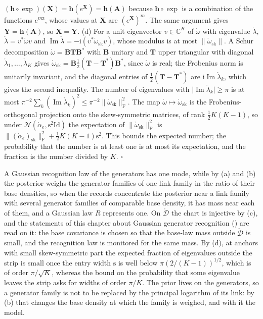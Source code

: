 $(\mathbf h\circ\exp)(\mathbf X)=\mathbf h(e^{\mathbf X})=\mathbf h(\mathbf A)$ because $\mathbf h\circ\exp$ is a
combination of the functions $e^{m\mathrm z}$, whose values at $\mathbf X$ are $(e^{\mathbf X})^m$. The same
argument gives $\mathbf Y=\mathbf h(\mathbf A)$, so $\mathbf X=\mathbf Y$.
(d) For a unit eigenvector $v\in\mathbb C^K$ of $\mathring\omega$ with eigenvalue $\mathring\lambda$,
$\mathring\lambda=v^*\mathring\omega v$ and $\operatorname{Im}\mathring\lambda=-\mathrm i(v^*\mathring\omega_{\mathrm{sk}}v)$,
whose modulus is at most $\lVert\mathring\omega_{\mathrm{sk}}\rVert$. A Schur decomposition
$\mathring\omega=\mathbf B\mathbf T\mathbf B^*$ with $\mathbf B$ unitary and $\mathbf T$ upper triangular with diagonal
$\mathring\lambda_1,\ldots,\mathring\lambda_K$ gives
$\mathring\omega_{\mathrm{sk}}=\mathbf B\tfrac12(\mathbf T-\mathbf T^*)\mathbf B^*$, since $\mathring\omega$ is real;
the Frobenius norm is unitarily invariant, and the diagonal entries of $\tfrac12(\mathbf T-\mathbf T^*)$ are
$\mathrm i\operatorname{Im}\mathring\lambda_k$, which gives the second inequality. The number of eigenvalues
with $\lvert\operatorname{Im}\mathring\lambda_k\rvert\geq\pi$ is at most
$\pi^{-2}\sum_k(\operatorname{Im}\mathring\lambda_k)^2\leq\pi^{-2}\lVert\mathring\omega_{\mathrm{sk}}\rVert^2_{\mathrm F}$.
The map $\mathring\omega\mapsto\mathring\omega_{\mathrm{sk}}$ is the Frobenius-orthogonal projection onto the
skew-symmetric matrices, of rank $\tfrac12K(K-1)$, so under $\mathcal N(\mathring\alpha_e,\mathrm s^2\mathrm{Id})$
the expectation of $\lVert\mathring\omega_{\mathrm{sk}}\rVert^2_{\mathrm F}$ is
$\lVert(\mathring\alpha_e)_{\mathrm{sk}}\rVert^2_{\mathrm F}+\tfrac12K(K-1)\mathrm s^2$. This bounds the expected
number; the probability that the number is at least one is at most its expectation, and the fraction is
the number divided by $K$. \hfill$\square$

A Gaussian recognition law of the generators has one mode, while by (a) and (b) the posterior weighs the
generator families of one link family in the ratio of their base densities, so when the records
concentrate the posterior near a link family with several generator families of comparable base density,
it has mass near each of them, and a Gaussian law $R$ represents one. On $\mathring{\mathcal D}$ the chart
is injective by (c), and the statements of this chapter about Gaussian generator recognition
() are read on
it: the base covariance is chosen so that the base-law mass outside $\mathring{\mathcal D}$ is small, and
the recognition law is monitored for the same mass. By (d), at anchors with small skew-symmetric part
the expected fraction of eigenvalues outside the strip is small once the entry width $\mathrm s$ is well
below $\pi(2/(K-1))^{1/2}$, which is of order $\pi/\sqrt K$, whereas the bound on the probability that
some eigenvalue leaves the strip asks for widths of order $\pi/K$. The prior lives on the generators, so a
generator family is not to be replaced by the principal logarithm of its link: by (b) that changes the
base density at which the family is weighed, and with it the model.

